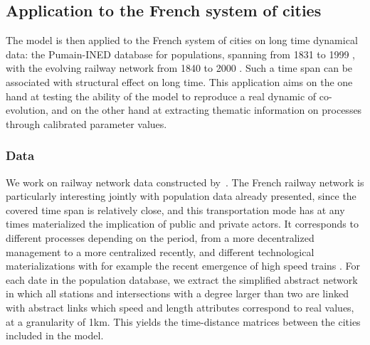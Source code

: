 





\subsection{Application to the French system of cities}


The model is then applied to the French system of cities on long time dynamical data: the Pumain-INED database for populations, spanning from 1831 to 1999 \citep{pumain1986fichier}, with the evolving railway network from 1840 to 2000 \citep{thevenin2013mapping}. Such a time span can be associated with structural effect on long time. This application aims on the one hand at testing the ability of the model to reproduce a real dynamic of co-evolution, and on the other hand at extracting thematic information on processes through calibrated parameter values.

\subsubsection{Data}

We work on railway network data constructed by~\cite{thevenin2013mapping}. The French railway network is particularly interesting jointly with population data already presented, since the covered time span is relatively close, and this transportation mode has at any times materialized the implication of public and private actors. It corresponds to different processes depending on the period, from a more decentralized management to a more centralized recently, and different technological materializations with for example the recent emergence of high speed trains \citep{zembri1997fondements}. For each date in the population database, we extract the simplified abstract network in which all stations and intersections with a degree larger than two are linked with abstract links which speed and length attributes correspond to real values, at a granularity of 1km. This yields the time-distance matrices between the cities included in the model.

